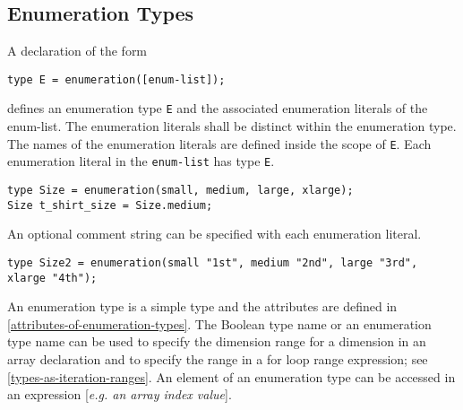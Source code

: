 \subsection{Enumeration Types}

A declaration of the form
\begin{lstlisting}[language=modelica]
type E = enumeration([enum-list]);
\end{lstlisting}
defines an enumeration type \lstinline!E! and the associated enumeration literals of
the enum-list. The enumeration literals shall be distinct within the
enumeration type. The names of the enumeration literals are defined
inside the scope of \lstinline!E!. Each enumeration literal in the \lstinline!enum-list! has
type \lstinline!E!.

\begin{example}
\begin{lstlisting}[language=modelica]
type Size = enumeration(small, medium, large, xlarge);
Size t_shirt_size = Size.medium;
\end{lstlisting}
\end{example}

An optional comment string can be specified with each enumeration literal.

\begin{example}
\begin{lstlisting}[language=modelica]
type Size2 = enumeration(small "1st", medium "2nd", large "3rd", xlarge "4th");
\end{lstlisting}
\end{example}

An enumeration type is a simple type and the attributes are defined in
\autoref{attributes-of-enumeration-types}. The Boolean type name or an enumeration type name can
be used to specify the dimension range for a dimension in an array
declaration and to specify the range in a for loop range expression; see
\autoref{types-as-iteration-ranges}. An element of an enumeration type can be accessed in
an expression {[}\emph{e.g. an array index value}{]}.

